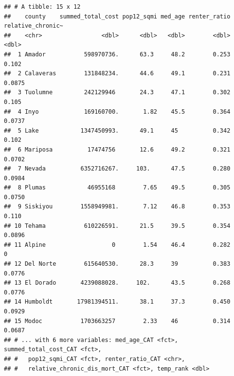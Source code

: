 \documentclass[
]{article}
\begin{document}
\begin{verbatim}
## # A tibble: 15 x 12
##    county    summed_total_cost pop12_sqmi med_age renter_ratio relative_chronic~
##    <chr>                 <dbl>      <dbl>   <dbl>        <dbl>             <dbl>
##  1 Amador           598970736.      63.3     48.2        0.253            0.102 
##  2 Calaveras        131848234.      44.6     49.1        0.231            0.0875
##  3 Tuolumne         242129946       24.3     47.1        0.302            0.105 
##  4 Inyo             169160700.       1.82    45.5        0.364            0.0737
##  5 Lake            1347450993.      49.1     45          0.342            0.102 
##  6 Mariposa          17474756       12.6     49.2        0.321            0.0702
##  7 Nevada          6352716267.     103.      47.5        0.280            0.0984
##  8 Plumas            46955168        7.65    49.5        0.305            0.0750
##  9 Siskiyou        1558949981.       7.12    46.8        0.353            0.110 
## 10 Tehama           610226591.      21.5     39.5        0.354            0.0896
## 11 Alpine                   0        1.54    46.4        0.282            0     
## 12 Del Norte        615640530.      28.3     39          0.383            0.0776
## 13 El Dorado       4239088028.     102.      43.5        0.268            0.0776
## 14 Humboldt       17981394511.      38.1     37.3        0.450            0.0929
## 15 Modoc           1703663257        2.33    46          0.314            0.0687
## # ... with 6 more variables: med_age_CAT <fct>, summed_total_cost_CAT <fct>,
## #   pop12_sqmi_CAT <fct>, renter_ratio_CAT <chr>,
## #   relative_chronic_dis_mort_CAT <fct>, temp_rank <dbl>
\end{verbatim}
\end{document}
